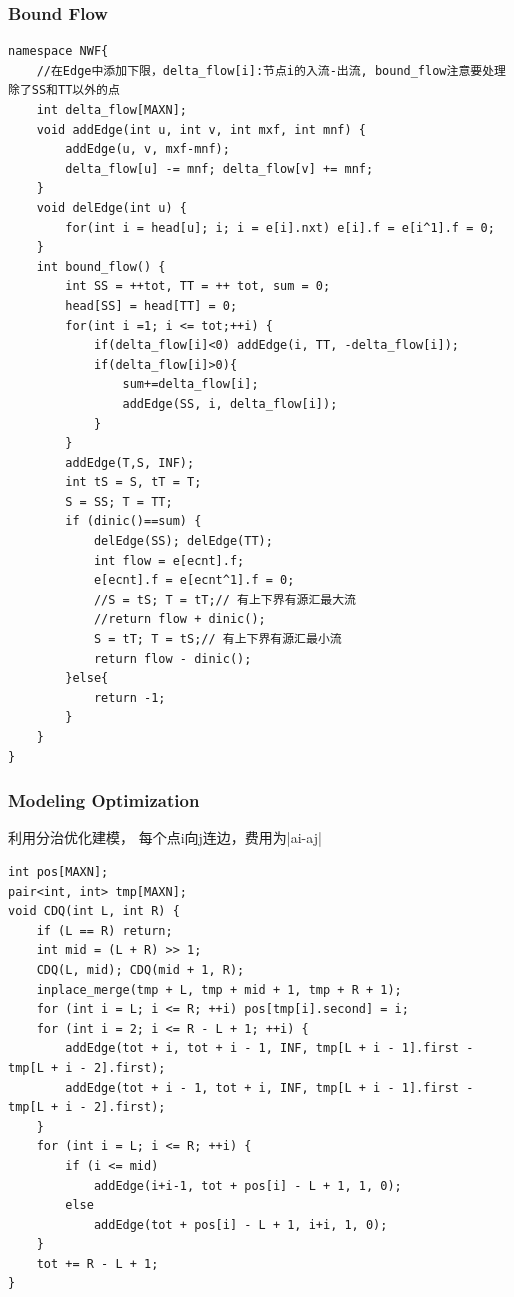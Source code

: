 \documentclass[10pt]{ctexart}
\begin{document}
{\subsubsection{Bound Flow}
\begin{lstlisting}
namespace NWF{
    //在Edge中添加下限，delta_flow[i]:节点i的入流-出流, bound_flow注意要处理除了SS和TT以外的点
    int delta_flow[MAXN];
    void addEdge(int u, int v, int mxf, int mnf) {
        addEdge(u, v, mxf-mnf); 
        delta_flow[u] -= mnf; delta_flow[v] += mnf;
    }
    void delEdge(int u) {
        for(int i = head[u]; i; i = e[i].nxt) e[i].f = e[i^1].f = 0;
    }
    int bound_flow() {
        int SS = ++tot, TT = ++ tot, sum = 0;
        head[SS] = head[TT] = 0;
        for(int i =1; i <= tot;++i) {
            if(delta_flow[i]<0) addEdge(i, TT, -delta_flow[i]);
            if(delta_flow[i]>0){
                sum+=delta_flow[i];
                addEdge(SS, i, delta_flow[i]);
            }
        }
        addEdge(T,S, INF);
        int tS = S, tT = T;
        S = SS; T = TT;
        if (dinic()==sum) {
            delEdge(SS); delEdge(TT);
            int flow = e[ecnt].f;
            e[ecnt].f = e[ecnt^1].f = 0;
            //S = tS; T = tT;// 有上下界有源汇最大流
            //return flow + dinic();
            S = tT; T = tS;// 有上下界有源汇最小流    
            return flow - dinic();
        }else{
            return -1;
        }
    }
}
\end{lstlisting}
\subsubsection{Modeling Optimization}
利用分治优化建模， 每个点i向j连边，费用为|ai-aj|
\begin{lstlisting}
int pos[MAXN];
pair<int, int> tmp[MAXN];
void CDQ(int L, int R) {
    if (L == R) return;
    int mid = (L + R) >> 1;
    CDQ(L, mid); CDQ(mid + 1, R);
    inplace_merge(tmp + L, tmp + mid + 1, tmp + R + 1);
    for (int i = L; i <= R; ++i) pos[tmp[i].second] = i;
    for (int i = 2; i <= R - L + 1; ++i) {
        addEdge(tot + i, tot + i - 1, INF, tmp[L + i - 1].first - tmp[L + i - 2].first);
        addEdge(tot + i - 1, tot + i, INF, tmp[L + i - 1].first - tmp[L + i - 2].first);
    }
    for (int i = L; i <= R; ++i) {
        if (i <= mid)
            addEdge(i+i-1, tot + pos[i] - L + 1, 1, 0);
        else 
            addEdge(tot + pos[i] - L + 1, i+i, 1, 0);
    }
    tot += R - L + 1;
}
\end{lstlisting}
}
\end{document}
